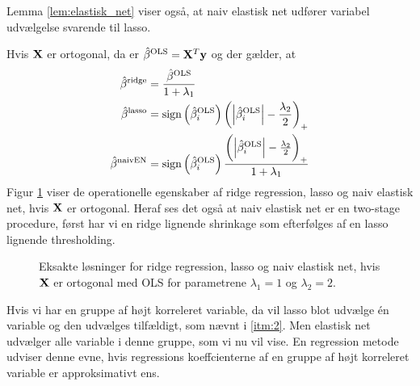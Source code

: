 Lemma \ref{lem:elastisk_net} viser også, at naiv  elastisk net udfører variabel udvælgelse svarende til lasso.
%
\begin{exmp}
Hvis \(\mathbf{X}\) er ortogonal, da er \(\hat{\beta}^\text{OLS} = \mathbf{X}^T \mathbf{y}\) og der gælder, at
\begin{align*}
\hat{\beta}^\text{ridge} &= \frac{\hat{\beta}^\text{OLS}}{1+\lambda_1} \\
\hat{\beta}^\text{lasso} &= \text{sign} \del{\hat{\beta}_i^\text{OLS}} \del{\left\vert \hat{\beta}_i^\text{OLS} \right\vert - \frac{\lambda_2}{2}}_+ \\
\hat{\beta}^\text{naivEN} &= \text{sign} \del{\hat{\beta}_i^\text{OLS}} \frac{\del{\left\vert \hat{\beta}_i^\text{OLS} \right\vert - \frac{\lambda_2}{2}}_+}{1+\lambda_1}
\end{align*}
Figur \ref{fig:elastisk2} viser de operationelle egenskaber af ridge regression, lasso og naiv elastisk net, hvis \(\mathbf{X}\) er ortogonal. Heraf ses det også at naiv elastisk net er en two-stage procedure, først har vi en ridge lignende shrinkage som efterfølges af en lasso lignende thresholding.
%
\begin{figure}[H]
\centering
\scalebox{0.8}{}
\caption[optional short text]{Eksakte løsninger for  ridge regression,  lasso og  naiv elastisk net, hvis \(\mathbf{X}\) er ortogonal med  OLS for parametrene \(\lambda_1=1\) og \(\lambda_2=2\).} \label{fig:elastisk2}
\end{figure}
%
\end{exmp}
%
Hvis vi har en gruppe af højt korreleret variable, da vil lasso blot udvælge én variable og den udvælges tilfældigt, som nævnt i \ref{itm:2}.
Men elastisk net udvælger alle variable i denne gruppe, som vi nu vil vise. 
En regression metode udviser denne evne, hvis regressions koeffcienterne af en gruppe af højt korreleret variable er approksimativt ens.

